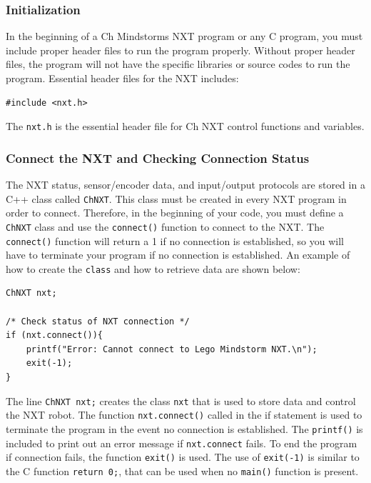 \documentclass[11pt]{article}
\begin{document}
\subsubsection{Initialization}
In the beginning of a Ch Mindstorms NXT program or any C program, you must include proper header 
files to run the program properly. Without proper header files, the program will not have the 
specific libraries or source codes to run the program. Essential header files for the NXT includes:
\begin{verbatim}
#include <nxt.h>
\end{verbatim}
\noindent
The \verb+nxt.h+ is the essential header file for Ch NXT control functions and variables.  

\subsubsection{Connect the NXT and Checking Connection Status}
The NXT status, sensor/encoder data, and input/output protocols are stored in a C++ class called 
\verb+ChNXT+. This class must be created in every NXT program in order to connect. Therefore, in the 
beginning of your code, you must define a \verb+ChNXT+ class and use the \verb+connect()+ function to
connect to the NXT. The \verb+connect()+ function will return a 1 if no connection is established, so
you will have to terminate your program if no connection is established. An example of how to create 
the \verb+class+ and how to retrieve data are shown below:
\begin{verbatim}
ChNXT nxt;

/* Check status of NXT connection */
if (nxt.connect()){
    printf("Error: Cannot connect to Lego Mindstorm NXT.\n");
    exit(-1);
}
\end{verbatim}
The line \verb+ChNXT nxt;+ creates the class \verb+nxt+ that is used to store data and control the 
NXT robot. The function \verb+nxt.connect()+ called in the if statement is used to terminate the 
program in the event no connection is established. The \verb+printf()+ is included to print out an 
error message if \verb+nxt.connect+ fails. To end the program if connection fails, the function 
\verb+exit()+ is used. The use of \verb+exit(-1)+ is similar to the C function \verb+return 0;+, that 
can be used when no \verb+main()+ function is present.
\end{document}
